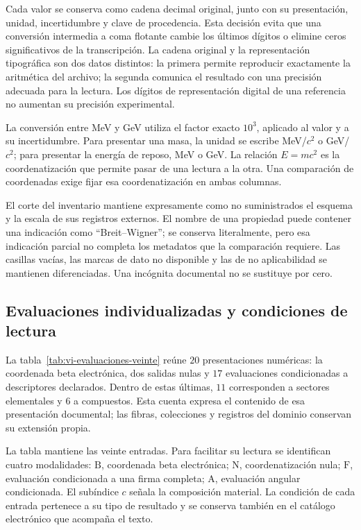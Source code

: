Cada valor se conserva como cadena decimal original, junto con su
presentación, unidad, incertidumbre y clave de procedencia. Esta decisión
evita que una conversión intermedia a coma flotante cambie los últimos
dígitos o elimine ceros significativos de la transcripción. La cadena
original y la representación tipográfica son dos datos distintos: la
primera permite reproducir exactamente la aritmética del archivo; la
segunda comunica el resultado con una precisión adecuada para la lectura.
Los dígitos de representación digital de una referencia no aumentan su
precisión experimental.

La conversión entre MeV y GeV utiliza el factor exacto \(10^3\), aplicado
al valor y a su incertidumbre. Para presentar una masa, la unidad se escribe
MeV/\(c^2\) o GeV/\(c^2\); para presentar la energía de reposo,
MeV o GeV. La relación \(E=mc^2\) es la coordenatización que permite pasar de una
lectura a la otra. Una comparación de coordenadas exige fijar esa coordenatización en
ambas columnas.

El corte del inventario mantiene expresamente como no suministrados el
esquema y la escala de sus registros externos. El nombre de una propiedad
puede contener una indicación como ``Breit--Wigner''; se conserva literalmente,
pero esa indicación parcial no completa los metadatos que la comparación
requiere. Las casillas vacías, las marcas de dato no disponible y las de
no aplicabilidad se mantienen diferenciadas. Una incógnita documental
no se sustituye por cero.

\subsection{Evaluaciones individualizadas y condiciones de lectura}
\label{subsec:vi-evaluaciones-documentadas}

La tabla~\ref{tab:vi-evaluaciones-veinte} reúne \(20\) presentaciones
numéricas: la coordenada beta electrónica, dos salidas nulas y
\(17\) evaluaciones condicionadas a descriptores declarados. Dentro de
estas últimas, \(11\) corresponden a sectores elementales y \(6\) a
compuestos. Esta cuenta expresa el contenido de esa presentación documental;
las fibras, colecciones y registros del dominio conservan su extensión propia.

La tabla mantiene las veinte entradas. Para facilitar su lectura se
identifican cuatro modalidades: \(\mathrm{B}\), coordenada beta
electrónica; \(\mathrm{N}\), coordenatización nula; \(\mathrm{F}\), evaluación
condicionada a una firma completa; \(\mathrm{A}\), evaluación angular
condicionada. El subíndice \(c\) señala la composición material. La
condición de cada entrada pertenece a su tipo de resultado y se conserva
también en el catálogo electrónico que acompaña el texto.

